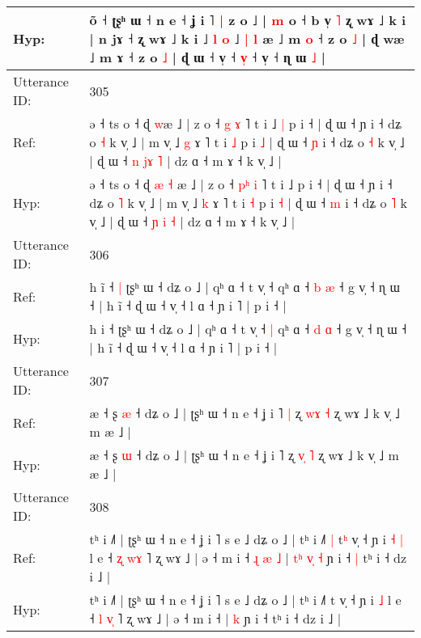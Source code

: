 \documentclass[10pt]{article}
\DeclareRobustCommand{\hl}[1]{{\textcolor{red}{#1}}}
\begin{document}
\begin{longtable}{ll}
 \\
Hyp: & õ ˧ ʈʂʰ ɯ ˧ n e ˧ ʝ i ˥\hl{ }\hl{|} z o ˩ | \hl{m} o ˧ b v̩ \hl{˥} ʐ wɤ ˩ k i\hl{}\hl{} | n jɤ ˧\hl{}\hl{}\hl{}\hl{}\hl{}\hl{}\hl{} ʐ wɤ ˩ k i ˩ \hl{l} \hl{}\hl{o} ˩ \hl{|} \hl{l}\hl{ }æ ˩ m \hl{o} ˧ z o \hl{˩} | ɖ wæ ˩ m ɤ ˧ z o \hl{˩} | ɖ ɯ ˧ v̩ ˧ \hl{}\hl{v}\hl{̩} ˧ v̩ ˧ ɳ ɯ \hl{˩} |
 \\
\midrule
Utterance ID: & 305 \\
Ref: & ə ˧ ts o ˧ ɖ\hl{}\hl{} \hl{}\hl{w}æ ˩ | z o ˧ \hl{}\hl{g} \hl{ɤ} ˥ t i ˩\hl{ }\hl{|} p i ˧ | ɖ ɯ ˧ ɲ i ˧ dʑ o \hl{˧} k v̩ ˩ | m v̩ ˩ \hl{g} ɤ ˥ t i \hl{˩} p i \hl{˩} | ɖ ɯ ˧ \hl{ɲ} i ˧ dʑ o \hl{˧} k v̩ ˩ | ɖ ɯ ˧ \hl{n} \hl{j}\hl{ɤ} \hl{˥} | dz ɑ ˧ m ɤ ˧ k v̩ ˩ |
 \\
Hyp: & ə ˧ ts o ˧ ɖ\hl{ }\hl{æ} \hl{˧}\hl{ }æ ˩ | z o ˧ \hl{p}\hl{ʰ} \hl{i} ˥ t i ˩\hl{}\hl{} p i ˧ | ɖ ɯ ˧ ɲ i ˧ dʑ o \hl{˥} k v̩ ˩ | m v̩ ˩ \hl{k} ɤ ˥ t i \hl{˧} p i \hl{˧} | ɖ ɯ ˧ \hl{m} i ˧ dʑ o \hl{˥} k v̩ ˩ | ɖ ɯ ˧ \hl{ɲ} \hl{}\hl{i} \hl{˧} | dz ɑ ˧ m ɤ ˧ k v̩ ˩ |
 \\
\midrule
Utterance ID: & 306 \\
Ref: & h i\hl{̃} ˧\hl{ }\hl{|} ʈʂʰ ɯ ˧ dʑ o ˩ | qʰ ɑ ˧ t v̩ ˧\hl{}\hl{} qʰ ɑ ˧ \hl{b} \hl{æ} ˧ g v̩ ˧ ɳ ɯ ˧ | h ĩ ˧ ɖ ɯ ˧ v̩ ˧ l ɑ ˧ ɲ i ˥ | p i ˧ |
 \\
Hyp: & h i\hl{} ˧\hl{}\hl{} ʈʂʰ ɯ ˧ dʑ o ˩ | qʰ ɑ ˧ t v̩ ˧\hl{ }\hl{|} qʰ ɑ ˧ \hl{d} \hl{ɑ} ˧ g v̩ ˧ ɳ ɯ ˧ | h ĩ ˧ ɖ ɯ ˧ v̩ ˧ l ɑ ˧ ɲ i ˥ | p i ˧ |
 \\
\midrule
Utterance ID: & 307 \\
Ref: & æ ˧ ʂ \hl{æ} ˧ dʑ o ˩ | ʈʂʰ ɯ ˧ n e ˧ ʝ i ˥\hl{ }\hl{|} ʐ \hl{w}\hl{ɤ} \hl{˧} ʐ wɤ ˩ k v̩ ˩ m æ ˩ |
 \\
Hyp: & æ ˧ ʂ \hl{ɯ} ˧ dʑ o ˩ | ʈʂʰ ɯ ˧ n e ˧ ʝ i ˥\hl{}\hl{} ʐ \hl{v}\hl{̩} \hl{˥} ʐ wɤ ˩ k v̩ ˩ m æ ˩ |
 \\
\midrule
Utterance ID: & 308 \\
Ref: & tʰ i ˩˥ | ʈʂʰ ɯ ˧ n e ˧ ʝ i ˥ s e ˩ dʑ o ˩ | tʰ i ˩˥\hl{ }\hl{|} t\hl{ʰ} v̩ ˧ ɲ i\hl{ }\hl{˧} \hl{|} l e ˧ \hl{ʐ} \hl{w}\hl{ɤ} ˥ ʐ wɤ ˩ | ə ˧ m i ˧\hl{ }\hl{ɻ}\hl{ }\hl{æ}\hl{ }\hl{˩} |\hl{ }\hl{t}\hl{ʰ}\hl{ }\hl{v}\hl{̩} \hl{˧} ɲ i ˧\hl{ }\hl{|} tʰ i ˧ dz i ˩ |
 \\
Hyp: & tʰ i ˩˥ | ʈʂʰ ɯ ˧ n e ˧ ʝ i ˥ s e ˩ dʑ o ˩ | tʰ i ˩˥\hl{}\hl{} t\hl{} v̩ ˧ ɲ i\hl{}\hl{} \hl{˩} l e ˧ \hl{l} \hl{v}\hl{̩} ˥ ʐ wɤ ˩ | ə ˧ m i ˧\hl{}\hl{}\hl{}\hl{}\hl{}\hl{} |\hl{}\hl{}\hl{}\hl{}\hl{}\hl{} \hl{k} ɲ i ˧\hl{}\hl{} tʰ i ˧ dz i ˩ |
 \\
\midrule

\end{longtable}
\end{document}
